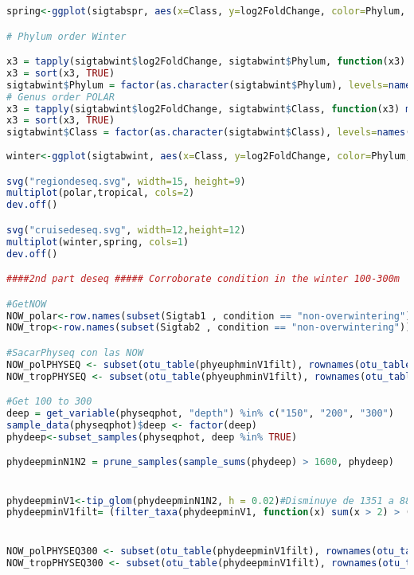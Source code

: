 \documentclass{article}
\begin{document}
\begin{lstlisting}[language=R,caption={N1N2figscripts}]
spring<-ggplot(sigtabspr, aes(x=Class, y=log2FoldChange, color=Phylum, label=rownames(sigtabspr))) + geom_point(size=3)+ geom_text(vjust="inward",hjust="inward", size = 2) + theme(axis.text.x = element_text(angle = -45, hjust = 0, vjust=0.5)) +geom_hline(yintercept = 0, color="black")+geom_hline(yintercept = c(-5,5), color="red")+ggtitle("Significant differential abundances between subpolar and subtropical North Atlantic regions in spring")+scale_color_manual(name = "Phylum",values=phylumcolors)

# Phylum order Winter

x3 = tapply(sigtabwint$log2FoldChange, sigtabwint$Phylum, function(x3) max(x3))
x3 = sort(x3, TRUE)
sigtabwint$Phylum = factor(as.character(sigtabwint$Phylum), levels=names(x3))
# Genus order POLAR
x3 = tapply(sigtabwint$log2FoldChange, sigtabwint$Class, function(x3) max(x3))
x3 = sort(x3, TRUE)
sigtabwint$Class = factor(as.character(sigtabwint$Class), levels=names(x3))
 
winter<-ggplot(sigtabwint, aes(x=Class, y=log2FoldChange, color=Phylum, label=rownames(sigtabwint))) + geom_point(size=3)+ geom_text(vjust="inward",hjust="inward", size = 2) + theme(axis.text.x = element_text(angle = -45, hjust = 0, vjust=0.5)) +geom_hline(yintercept = 0, color="black")+geom_hline(yintercept = c(-5,5), color="red")+ggtitle("Significant differential abundances between subpolar and subtropical North Atlantic regions in winter")+scale_color_manual(name = "Phylum",values=phylumcolors)

svg("regiondeseq.svg", width=15, height=9)
multiplot(polar,tropical, cols=2)
dev.off()

svg("cruisedeseq.svg", width=12,height=12)
multiplot(winter,spring, cols=1)
dev.off()

####2nd part deseq ##### Corroborate condition in the winter 100-300m

#GetNOW
NOW_polar<-row.names(subset(Sigtab1 , condition == "non-overwintering")) 
NOW_trop<-row.names(subset(Sigtab2 , condition == "non-overwintering"))

#SacarPhyseq con las NOW
NOW_polPHYSEQ <- subset(otu_table(phyeuphminV1filt), rownames(otu_table(phyeuphminV1filt)) %in% NOW_polar)
NOW_tropPHYSEQ <- subset(otu_table(phyeuphminV1filt), rownames(otu_table(phyeuphminV1filt)) %in% NOW_trop)

#Get 100 to 300 
deep = get_variable(physeqphot, "depth") %in% c("150", "200", "300")
sample_data(physeqphot)$deep <- factor(deep)
phydeep<-subset_samples(physeqphot, deep %in% TRUE)

phydeepminN1N2 = prune_samples(sample_sums(phydeep) > 1600, phydeep)


phydeepminV1<-tip_glom(phydeepminN1N2, h = 0.02)#Disminuye de 1351 a 886
phydeepminV1filt= (filter_taxa(phydeepminV1, function(x) sum(x > 2) > (0.015*length(x)), TRUE))


NOW_polPHYSEQ300 <- subset(otu_table(phydeepminV1filt), rownames(otu_table(phydeepminV1filt)) %in% NOW_polar)
NOW_tropPHYSEQ300 <- subset(otu_table(phydeepminV1filt), rownames(otu_table(phydeepminV1filt)) %in% NOW_trop)


\end{lstlisting}
\end{document}
